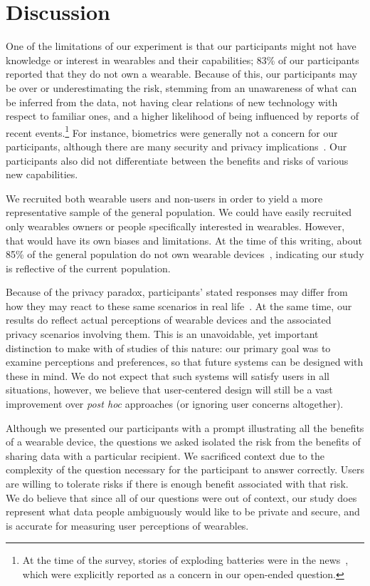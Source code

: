 \documentclass[conference]{IEEEtran}
\begin{document}
\section{Discussion}

One of the limitations of our experiment is that our participants might not have knowledge or interest in wearables and their capabilities; 83\% of our participants reported that they do not own a wearable. Because of this, our participants may be over or underestimating the risk, stemming from an unawareness of what can be inferred from the data, not having clear relations of new technology with respect to familiar ones, and a higher likelihood of being influenced by reports of recent events.\footnote{At the time of the survey, stories of exploding batteries were in the news~\cite{1_levin_2014}, which were explicitly reported as a concern in our open-ended question.}  For instance, biometrics were generally not a concern for our participants, although there are many security and privacy implications~\cite{prabhakar2003biometric}. Our participants also did not differentiate between the benefits and risks of various new capabilities.

We recruited both wearable users and non-users in order to yield a more representative sample of the general population. We could have easily recruited only wearables owners or people specifically interested in wearables. However, that would have its own biases and limitations. At the time of this writing, about 85\% of the general population do not own wearable devices~\cite{Nilsen,WearableStatNews}, indicating our study is reflective of the current population. 

Because of the privacy paradox, participants' stated responses may differ from how they may react to these same scenarios in real life~\cite{norberg2007privacy, jensen2005privacy}. At the same time, our results do reflect actual perceptions of wearable devices and the associated privacy scenarios involving them. This is an unavoidable, yet important distinction to make with of studies of this nature: our primary goal was to examine perceptions and preferences, so that future systems can be designed with these in mind. We do not expect that such systems will satisfy users in all situations, however, we believe that user-centered design will still be a vast improvement over {\it post hoc} approaches (or ignoring user concerns altogether). 

Although we presented our participants with a prompt illustrating all the benefits of a wearable device, the questions we asked isolated the risk from the benefits of sharing data with a particular recipient. We sacrificed context due to the complexity of the question necessary for the participant to answer correctly. Users are willing to tolerate risks if there is enough benefit associated with that risk. We do believe that since all of our questions were out of context, our study does represent what data people ambiguously would like to be private and secure, and is accurate for measuring user perceptions of wearables.\\
\end{document}
